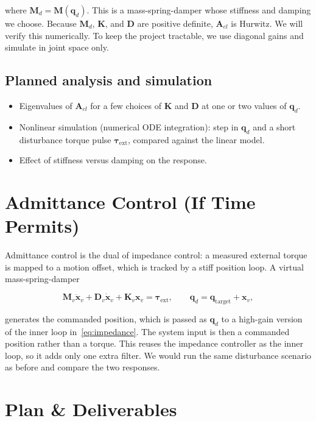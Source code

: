 \documentclass[letterpaper, 10pt, conference]{ieeeconf}
\begin{document}
where $\mathbf{M}_d=\mathbf{M}(\mathbf{q}_d)$. This is
a mass-spring-damper whose stiffness and damping we
choose. Because $\mathbf{M}_d$, $\mathbf{K}$, and
$\mathbf{D}$ are positive definite, $\mathbf{A}_{cl}$
is Hurwitz. We will verify this numerically. To keep
the project tractable, we use diagonal gains and
simulate in joint space only.

\subsection*{Planned analysis and simulation}

\begin{itemize}
\item Eigenvalues of $\mathbf{A}_{cl}$ for a few
choices of $\mathbf{K}$ and $\mathbf{D}$ at one or two
values of $\mathbf{q}_d$.
\item Nonlinear simulation (numerical ODE
integration): step in $\mathbf{q}_d$ and a short
disturbance torque pulse $\boldsymbol{\tau}_{\mathrm{ext}}$,
compared against the linear model.
\item Effect of stiffness versus damping on the
response.
\end{itemize}

\section{Admittance Control (If Time Permits)}

Admittance control is the dual of impedance control:
a measured external torque is mapped to a motion
offset, which is tracked by a stiff position loop. A
virtual mass-spring-damper

\begin{equation}
\mathbf{M}_v\ddot{\mathbf{x}}_v
+\mathbf{D}_v\dot{\mathbf{x}}_v
+\mathbf{K}_v\mathbf{x}_v
=\boldsymbol{\tau}_{\mathrm{ext}},
\qquad
\mathbf{q}_d=\mathbf{q}_{\mathrm{target}}+\mathbf{x}_v,
\label{eq:admittance}
\end{equation}

generates the commanded position, which is passed as
$\mathbf{q}_d$ to a high-gain version of the inner loop
in~\eqref{eq:impedance}. The system input is then a
commanded position rather than a torque. This reuses
the impedance controller as the inner loop, so it adds
only one extra filter. We would run the same
disturbance scenario as before and compare the two
responses.

\section{Plan \& Deliverables}
\end{document}
